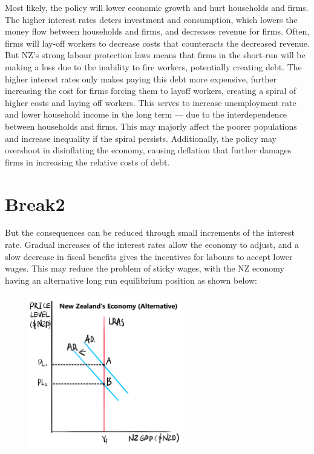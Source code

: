 \documentclass[a4paper,12pt]{article}
\begin{document}

Most likely, the policy will lower economic growth and hurt households and firms. The higher interest rates deters investment and consumption, which lowers the money flow between households and firms, and decreases revenue for firms. Often, firms will lay-off workers to decrease costs that counteracts the decreased revenue. But NZ's strong labour protection laws means that firms in the short-run will be making a loss due to the inability to fire workers, potentially creating debt. The higher interest rates only makes paying this debt more expensive, further increasing the cost for firms forcing them to layoff workers, creating a spiral of higher costs and laying off workers. This serves to increase unemployment rate and lower household income in the long term --- due to the interdependence between households and firms. This may majorly affect the poorer populations and increase inequality if the spiral persists.
Additionally, the policy may overshoot in disinflating the economy, causing deflation that further damages firms in increasing the relative costs of debt.

\section{Break2}
But the consequences can be reduced through small increments of the interest rate. Gradual increases of the interest rates allow the economy to adjust, and a slow decrease in fiscal benefits gives the incentives for labours to accept lower wages. This may reduce the problem of sticky wages, with the NZ economy having an alternative long run equilibrium position as shown below:

\begin{figure}[H]
    \centering
    \includegraphics[width=0.6\textwidth]{assets/macro_alt.png}
\end{figure}
\end{document}
